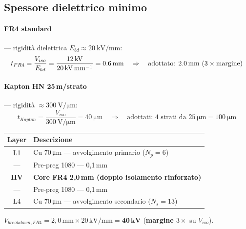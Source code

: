 \documentclass[a4paper,11pt]{article}
\begin{document}
\subsection{Spessore dielettrico minimo}

\paragraph{FR4 standard} — rigidità dielettrica $E_{bd} \approx \SI{20}{\kilo\volt\per\milli\metre}$:
\begin{equation}
  t_{FR4} = \frac{V_{iso}}{E_{bd}} = \frac{\SI{12}{\kilo\volt}}{\SI{20}{\kilo\volt\per\milli\metre}}
          = \SI{0{,}6}{\milli\metre} \quad \Rightarrow \quad \text{adottato: } \SI{2{,}0}{\milli\metre}\ (3\times \text{margine})
  \label{eq:tFR4}
\end{equation}

\paragraph{Kapton HN 25\,\textmu m/strato} — rigidità $\approx \SI{300}{\volt\per\micro\metre}$:
\begin{equation}
  t_{Kapton} = \frac{V_{iso}}{\SI{300}{\volt\per\micro\metre}} = \SI{40}{\micro\metre}
             \quad \Rightarrow \quad \text{adottati: } 4 \text{ strati da } \SI{25}{\micro\metre} = \SI{100}{\micro\metre}
  \label{eq:tKapton}
\end{equation}

\begin{tcolorbox}[resultbox, title={Soluzione adottata — Stack-up PCB}]
\begin{center}
\begin{tabular}{cl}
  \toprule
  \textbf{Layer} & \textbf{Descrizione} \\
  \midrule
  L1 & Cu 70\,\si{\micro\metre} — avvolgimento primario ($N_p = 6$) \\
  — & Pre-preg 1080 — 0{,}1\,mm \\
  \textcolor{accent}{\textbf{HV}} & \textcolor{accent}{\textbf{Core FR4 2{,}0\,mm (doppio isolamento rinforzato)}} \\
  — & Pre-preg 1080 — 0{,}1\,mm \\
  L4 & Cu 70\,\si{\micro\metre} — avvolgimento secondario ($N_s = 13$) \\
  \bottomrule
\end{tabular}
\end{center}
\medskip
$V_{breakdown,FR4} = 2{,}0\,\mathrm{mm} \times 20\,\mathrm{kV/mm} = \mathbf{40\,kV}$
\quad (\textbf{margine $3\times$} su $V_{iso}$).
\end{tcolorbox}
\end{document}

